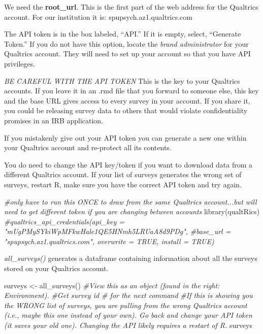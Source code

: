 \documentclass[
  english,
]{book}
\newenvironment{Shaded}{\begin{snugshade}}{\end{snugshade}}
\newcommand{\CommentTok}[1]{\textcolor[rgb]{0.56,0.35,0.01}{\textit{#1}}}
\newcommand{\FunctionTok}[1]{\textcolor[rgb]{0.00,0.00,0.00}{#1}}
\newcommand{\NormalTok}[1]{#1}
\newcommand{\OtherTok}[1]{\textcolor[rgb]{0.56,0.35,0.01}{#1}}
\begin{document}
We need the \textbf{root\_url}. This is the first part of the web address for the Qualtrics account. For our institution it is: spupsych.az1.qualtrics.com

The API token is in the box labeled, ``API.'' If it is empty, select, ``Generate Token.'' If you do not have this option, locate the \emph{brand administrator} for your Qualtrics account. They will need to set up your account so that you have API privileges.

\emph{BE CAREFUL WITH THE API TOKEN} This is the key to your Qualtrics accounts. If you leave it in an .rmd file that you forward to someone else, this key and the base URL gives access to every survey in your account. If you share it, you could be releasing survey data to others that would violate confidentiality promises in an IRB application.

If you mistakenly give out your API token you can generate a new one within your Qualtrics account and re-protect all its contents.

You do need to change the API key/token if you want to download data from a different Qualtrics account. If your list of surveys generates the wrong set of surveys, restart R, make sure you have the correct API token and try again.

\begin{Shaded}
\begin{Highlighting}[]
\CommentTok{\#only have to run this ONCE to draw from the same Qualtrics account...but will need to get different token if you are changing between accounts }
\FunctionTok{library}\NormalTok{(qualtRics)}
\CommentTok{\#qualtrics\_api\_credentials(api\_key = "mUgPMySYkiWpMFkwHale1QE5HNmh5LRUaA8d9PDg",}
              \CommentTok{\#base\_url = "spupsych.az1.qualtrics.com", overwrite = TRUE, install = TRUE)}
\end{Highlighting}
\end{Shaded}

\emph{all\_surveys()} generates a dataframe containing information about all the surveys stored on your Qualtrics account.

\begin{Shaded}
\begin{Highlighting}[]
\NormalTok{surveys }\OtherTok{\textless{}{-}} \FunctionTok{all\_surveys}\NormalTok{() }
\CommentTok{\#View this as an object (found in the right: Environment).  }
\CommentTok{\#Get survey id \# for the next command}
\CommentTok{\#If this is showing you the WRONG list of surveys, you are pulling from the wrong Qualtrics account (i.e., maybe this one instead of your own). Go back and change your API token (it saves your old one). Changing the API likely requires a restart of R.}
\NormalTok{surveys}
\end{Highlighting}
\end{Shaded}
\end{document}
